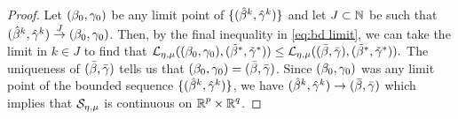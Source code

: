 \begin{proof}
%
Let $(\beta_0,\gamma_0)$ be any limit point of $\{(\hat{\beta}^k,{\hat{\gamma}}^k)\}$
and let $J\subset\operatorname{\mathbb{N}}$ 
be such that
$(\hat{\beta}^k,{\hat{\gamma}}^k)\overset{J}{\rightarrow}(\beta_0,\gamma_0)$. Then, by
the final inequality in 
\eqref{eq:bd limit}, we can take the limit in $k\in J$ to find
that 
\(
\operatorname{\mathcal{L}}_{{\eta,\mu}}((\beta_0,\gamma_0),(\tilde\beta^*,{\tilde{\gamma}}^*))
\le
\operatorname{\mathcal{L}}_{{\eta,\mu}}(({\bar\beta},{\bar{\gamma}}),(\tilde\beta^*,{\tilde{\gamma}}^*)).
\)
The uniqueness of $({\bar\beta},{\bar{\gamma}})$ tells us that
$(\beta_0,\gamma_0)=({\bar\beta},{\bar{\gamma}})$. 
Since 
$(\beta_0,\gamma_0)$ was any limit point of the bounded sequence 
$\{(\hat{\beta}^k,{\hat{\gamma}}^k)\}$,
we have $(\hat{\beta}^k,{\hat{\gamma}}^k)\rightarrow ({\bar\beta},{\bar{\gamma}})$ which
implies that $\mathcal{S}_{\eta,\mu}$ is continuous on ${\operatorname{\mathbb{R}}^p}\times{\operatorname{\mathbb{R}}^q}$.
\end{proof}

